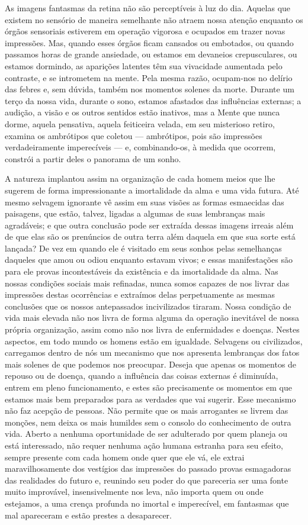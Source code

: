 \documentclass[11pt,a5paper,twoside,openany]{book}
\begin{document}
As imagens fantasmas da retina não são perceptíveis à luz do dia. Aquelas que existem no sensório de maneira semelhante não atraem nossa atenção enquanto os órgãos sensoriais estiverem em operação vigorosa e ocupados em trazer novas impressões. Mas, quando esses órgãos ficam cansados ​​ou embotados, ou quando passamos horas de grande ansiedade, ou estamos em devaneios crepusculares, ou estamos dormindo, as aparições latentes têm sua vivacidade aumentada pelo contraste, e se intrometem na mente. Pela mesma razão, ocupam-nos no delírio das febres e, sem dúvida, também nos momentos solenes da morte. Durante um terço da nossa vida, durante o sono, estamos afastados das influências externas; a audição, a visão e os outros sentidos estão inativos, mas a Mente que nunca dorme, aquela pensativa, aquela feiticeira velada, em seu misterioso retiro, examina os ambrótipos que coletou — ambrótipos, pois são impressões verdadeiramente imperecíveis — e, combinando-os, à medida que ocorrem, constrói a partir deles o panorama de um sonho.

A natureza implantou assim na organização de cada homem meios que lhe sugerem de forma impressionante a imortalidade da alma e uma vida futura. Até mesmo selvagem ignorante vê assim em suas visões as formas esmaecidas das paisagens, que estão, talvez, ligadas a algumas de suas lembranças mais agradáveis; e que outra conclusão pode ser extraída dessas imagens irreais além de que elas são os prenúncios de outra terra além daquela em que sua sorte está lançada? De vez em quando ele é visitado em seus sonhos pelas semelhanças daqueles que amou ou odiou enquanto estavam vivos; e essas manifestações são para ele provas incontestáveis ​​da existência e da imortalidade da alma. Nas nossas condições sociais mais refinadas, nunca somos capazes de nos livrar das impressões destas ocorrências e extraímos delas perpetuamente as mesmas conclusões que os nossos antepassados ​​incivilizados tiraram. Nossa condição de vida mais elevada não nos livra de forma alguma da operação inevitável de nossa própria organização, assim como não nos livra de enfermidades e doenças. Nestes aspectos, em todo mundo os homens estão em igualdade. Selvagens ou civilizados, carregamos dentro de nós um mecanismo que nos apresenta lembranças dos fatos mais solenes de que podemos nos preocupar. Deseja que apenas os momentos de repouso ou de doença, quando a influência das coisas externas é diminuída, entrem em pleno funcionamento, e estes são precisamente os momentos em que estamos mais bem preparados para as verdades que vai sugerir. Esse mecanismo não faz acepção de pessoas. Não permite que os mais arrogantes se livrem das monções, nem deixa os mais humildes sem o consolo do conhecimento de outra vida. Aberto a nenhuma oportunidade de ser adulterado por quem planeja ou está interessado, não requer nenhuma ação humana estranha para seu efeito, sempre presente com cada homem onde quer que ele vá, ele extrai maravilhosamente dos vestígios das impressões do passado provas esmagadoras das realidades do futuro e, reunindo seu poder do que pareceria ser uma fonte muito improvável, insensivelmente nos leva, não importa quem ou onde estejamos, a uma crença profunda no imortal e imperecível, em fantasmas que mal apareceram e estão prestes a desaparecer.
\end{document}
